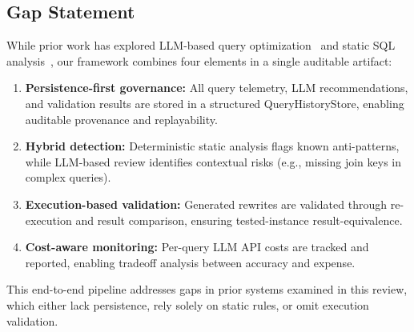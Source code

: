 \documentclass[conference]{IEEEtran}
\begin{document}
\subsection{Gap Statement}
While prior work has explored LLM-based query optimization~\cite{rbot2025,llmopt2025,llmsteer2024,lapuda2024,llm4hint2025} and static SQL analysis~\cite{sqlaudit,gcpantipattern,dwhauditor}, our framework combines four elements in a single auditable artifact:

\begin{enumerate}
    \item \textbf{Persistence-first governance:} All query telemetry, LLM recommendations, and validation results are stored in a structured QueryHistoryStore, enabling auditable provenance and replayability.
    \item \textbf{Hybrid detection:} Deterministic static analysis flags known anti-patterns, while LLM-based review identifies contextual risks (e.g., missing join keys in complex queries).
    \item \textbf{Execution-based validation:} Generated rewrites are validated through re-execution and result comparison, ensuring tested-instance result-equivalence.
    \item \textbf{Cost-aware monitoring:} Per-query LLM API costs are tracked and reported, enabling tradeoff analysis between accuracy and expense.
\end{enumerate}

This end-to-end pipeline addresses gaps in prior systems examined in this review, which either lack persistence, rely solely on static rules, or omit execution validation.

\begin{table}[t]
\caption{Rule-Based vs. LLM-Assisted Coverage}
\label{tab:rulebased}
\centering
\small
{}
\end{table}
\end{document}
